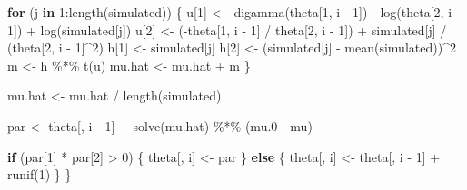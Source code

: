 \documentclass[9pt,twocolumn,twoside,]{pnas-new}
\newenvironment{Shaded}{}{}
\newcommand{\ControlFlowTok}[1]{\textcolor[rgb]{0.00,0.44,0.13}{\textbf{#1}}}
\newcommand{\DecValTok}[1]{\textcolor[rgb]{0.25,0.63,0.44}{#1}}
\newcommand{\FloatTok}[1]{\textcolor[rgb]{0.25,0.63,0.44}{#1}}
\newcommand{\FunctionTok}[1]{\textcolor[rgb]{0.02,0.16,0.49}{#1}}
\newcommand{\NormalTok}[1]{#1}
\newcommand{\OtherTok}[1]{\textcolor[rgb]{0.00,0.44,0.13}{#1}}
\newcommand{\SpecialCharTok}[1]{\textcolor[rgb]{0.25,0.44,0.63}{#1}}
\begin{document}
\begin{Shaded}
\begin{Highlighting}[]
    \ControlFlowTok{for}\NormalTok{ (j }\ControlFlowTok{in} \DecValTok{1}\SpecialCharTok{:}\FunctionTok{length}\NormalTok{(simulated)) \{}
\NormalTok{      u[}\DecValTok{1}\NormalTok{] }\OtherTok{\textless{}{-}} \SpecialCharTok{{-}}\FunctionTok{digamma}\NormalTok{(theta[}\DecValTok{1}\NormalTok{, i }\SpecialCharTok{{-}} \DecValTok{1}\NormalTok{]) }\SpecialCharTok{{-}}
              \FunctionTok{log}\NormalTok{(theta[}\DecValTok{2}\NormalTok{, i }\SpecialCharTok{{-}} \DecValTok{1}\NormalTok{]) }\SpecialCharTok{+}
              \FunctionTok{log}\NormalTok{(simulated[j])}
\NormalTok{      u[}\DecValTok{2}\NormalTok{] }\OtherTok{\textless{}{-}}\NormalTok{ (}\SpecialCharTok{{-}}\NormalTok{theta[}\DecValTok{1}\NormalTok{, i }\SpecialCharTok{{-}} \DecValTok{1}\NormalTok{] }\SpecialCharTok{/}\NormalTok{ theta[}\DecValTok{2}\NormalTok{, i }\SpecialCharTok{{-}} \DecValTok{1}\NormalTok{]) }\SpecialCharTok{+}
\NormalTok{              simulated[j] }\SpecialCharTok{/}\NormalTok{ (theta[}\DecValTok{2}\NormalTok{, i }\SpecialCharTok{{-}} \DecValTok{1}\NormalTok{]}\SpecialCharTok{\^{}}\DecValTok{2}\NormalTok{)}
\NormalTok{      h[}\DecValTok{1}\NormalTok{] }\OtherTok{\textless{}{-}}\NormalTok{ simulated[j]}
\NormalTok{      h[}\DecValTok{2}\NormalTok{] }\OtherTok{\textless{}{-}}\NormalTok{ (simulated[j] }\SpecialCharTok{{-}} \FunctionTok{mean}\NormalTok{(simulated))}\SpecialCharTok{\^{}}\DecValTok{2}
\NormalTok{      m }\OtherTok{\textless{}{-}}\NormalTok{ h }\SpecialCharTok{\%*\%} \FunctionTok{t}\NormalTok{(u)}
\NormalTok{      mu.hat }\OtherTok{\textless{}{-}}\NormalTok{ mu.hat }\SpecialCharTok{+}\NormalTok{ m}
\NormalTok{    \}}

\NormalTok{    mu.hat }\OtherTok{\textless{}{-}}\NormalTok{ mu.hat }\SpecialCharTok{/} \FunctionTok{length}\NormalTok{(simulated)}

\NormalTok{    par }\OtherTok{\textless{}{-}}\NormalTok{ theta[, i }\SpecialCharTok{{-}} \DecValTok{1}\NormalTok{] }\SpecialCharTok{+}
            \FunctionTok{solve}\NormalTok{(mu.hat) }\SpecialCharTok{\%*\%}\NormalTok{ (mu}\FloatTok{.0} \SpecialCharTok{{-}}\NormalTok{ mu)}

    \ControlFlowTok{if}\NormalTok{ (par[}\DecValTok{1}\NormalTok{] }\SpecialCharTok{*}\NormalTok{ par[}\DecValTok{2}\NormalTok{] }\SpecialCharTok{\textgreater{}} \DecValTok{0}\NormalTok{) \{}
\NormalTok{      theta[, i] }\OtherTok{\textless{}{-}}\NormalTok{ par}
\NormalTok{    \} }\ControlFlowTok{else}\NormalTok{ \{}
\NormalTok{      theta[, i] }\OtherTok{\textless{}{-}}\NormalTok{ theta[, i }\SpecialCharTok{{-}} \DecValTok{1}\NormalTok{] }\SpecialCharTok{+}
              \FunctionTok{runif}\NormalTok{(}\DecValTok{1}\NormalTok{)}
\NormalTok{    \}}
\NormalTok{  \}}


\end{Highlighting}
\end{Shaded}
\end{document}
